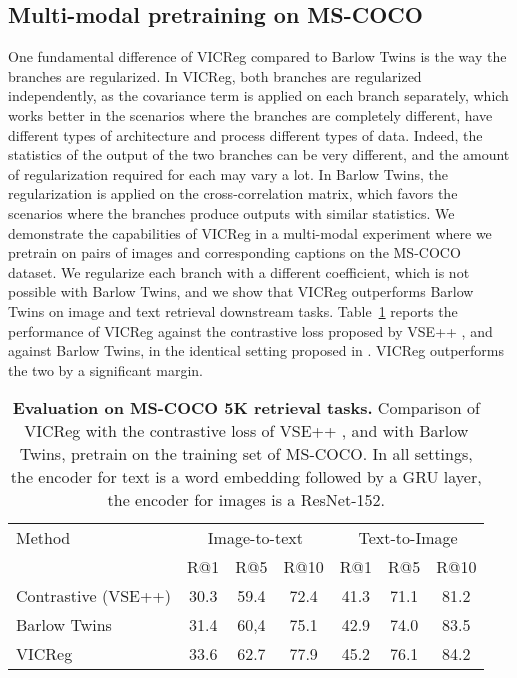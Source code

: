 \documentclass{article}
\begin{document}
\subsection{Multi-modal pretraining on MS-COCO}

One fundamental difference of VICReg compared to Barlow Twins is the way the branches are regularized. In VICReg, both branches are regularized independently, as the covariance term is applied on each branch separately, which works better in the scenarios where the branches are completely different, have different types of architecture and process different types of data. Indeed, the statistics of the output of the two branches can be very different, and the amount of regularization required for each may vary a lot. In Barlow Twins, the regularization is applied on the cross-correlation matrix, which favors the scenarios where the branches produce outputs with similar statistics. We demonstrate the capabilities of VICReg in a multi-modal experiment where we pretrain on pairs of images and corresponding captions on the MS-COCO dataset. We regularize each branch with a different coefficient, which is not possible with Barlow Twins, and we show that VICReg outperforms Barlow Twins on image and text retrieval downstream tasks. Table~\ref{tab:retrieval} reports the performance of VICReg against the contrastive loss proposed by VSE++ \cite{faghri2018vse}, and against Barlow Twins, in the identical setting proposed in \cite{faghri2018vse}. VICReg outperforms the two by a significant margin.

\begin{table}[t]
\caption{\textbf{Evaluation on MS-COCO 5K retrieval tasks.} Comparison of VICReg with the contrastive loss of VSE++ \cite{faghri2018vse}, and with Barlow Twins, pretrain on the training set of MS-COCO. In all settings, the encoder for text is a word embedding followed by a GRU layer, the encoder for images is a ResNet-152.}
\label{tab:retrieval}
\vspace{-1.5em}
\setlength{\tabcolsep}{10.5pt}
\vskip 0.15in
\begin{center}
\begin{tabular}{lcccccc}
\toprule
Method & \multicolumn{3}{c}{Image-to-text} &  \multicolumn{3}{c}{Text-to-Image} \\
                & R@1 & R@5 & R@10 & R@1 & R@5 & R@10 \\
\midrule
Contrastive (VSE++) &	30.3	& 59.4 &72.4	&41.3&	71.1&	81.2 \\
Barlow Twins	&31.4	&60,4	&75.1&	42.9	&74.0&	83.5 \\
VICReg	&33.6&	62.7&	77.9	&45.2&	76.1&	84.2 \\
\bottomrule
\end{tabular}
\end{center}
\vspace{-2mm}
\end{table}
\end{document}

